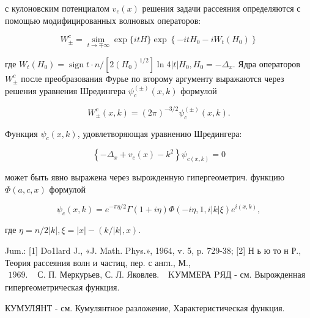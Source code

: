 \documentclass[10pt]{article}
\begin{document}
с кулоновским потенциалом $v_{c}(x)$ решения задачи рассеяния определяются с помощью модифицированных волновых операторов:



\[

W_{ \pm}^{c}=\underset{t \rightarrow \mp \infty}{\operatorname{sim}} \exp \{i t H\} \exp \left\{-i t H_{0}-i W_{t}\left(H_{0}\right)\right\}

\]



где $W_{t}\left(H_{0}\right)=\operatorname{sign} t \cdot n /\left[2\left(H_{0}\right)^{1 / 2}\right] \ln 4|t| H_{0}, H_{0}=-\Delta_{x}$. Ядра операторов $W_{ \pm}^{c}$ после преобразования Фурье по второму аргументу выражаются через решения уравнения Шредингера $\psi_{c}^{( \pm)}(x, k)$ формулой



\[

W_{ \pm}^{c}(x, k)=(2 \pi)^{-3 / 2} \psi_{c}^{( \pm)}(x, k) .

\]



Функция $\psi_{c}(x, k)$, удовлетворяющая уравнению Шредингера:



\[

\left\{-\Delta_{x}+v_{c}(x)-k^{2}\right\} \psi_{c(x, k)}=0

\]



может быть явно выражена через вырожденную гипергеометрич. функцию $\Phi(a, c, x)$ формулой



\[

\psi_{c}(x, k)=e^{-\pi \eta / 2} \Gamma(1+i \eta) \Phi(-i \eta, 1, i|k| \xi) e^{i(x, k)},

\]



где $\eta=n / 2|k|, \xi=|x|-(k /|k|, x)$.



Jum.: [1] Do1lard J., «J. Math. Phys.», 1964, v. 5, p. 729-38; [2] Н ь ю то н Р., Теория рассеяния волн и частиц, пер. с англ., М., $\begin{array}{ll}1969 . & \text { С. П. Меркурьев, С. Л. Яковлев. }\end{array}$ KУММЕРА PЯД - см. Вырожденная гипергеометрическая функция.



КУМУЛЯНТ - см. Кумулянтное разложение, Характеристическая функция.
\end{document}
